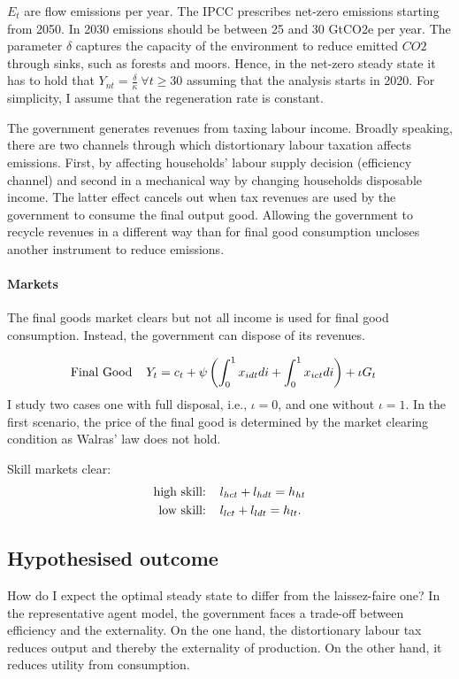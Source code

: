$E_t$ are flow emissions per year. The IPCC prescribes net-zero emissions starting from 2050. In 2030 emissions should be between 25 and 30 GtCO2e per year. The parameter $\delta$ captures the capacity of the environment to reduce emitted $CO2$ through sinks, such as forests and moors. Hence, in the net-zero steady state it has to hold that $Y_{nt}=\frac{\delta}{\kappa}\ \forall t\geq 30$ assuming that the analysis starts in 2020. For simplicity, I assume that the regeneration rate is constant. %

The government generates revenues from taxing labour income. 
Broadly speaking, there are two channels through which distortionary labour taxation affects emissions. First, by affecting households' labour supply decision (efficiency channel) and second in a mechanical way by changing households disposable income. The latter effect cancels out when tax revenues are used by the government to consume the final output good. Allowing the government to recycle revenues in a different way than for final good consumption uncloses another instrument to reduce emissions. 

\paragraph{Markets}
The final goods market clears but not all income is used for final good consumption.  Instead, the government can dispose of its revenues.
 
\begin{align*}
\text{Final Good}\hspace{4mm}& Y_{t}=c_t+\psi\left(\int_{0}^1x_{idt}di+\int_{0}^1x_{ict}di\right)+\iota G_t
\end{align*}
 I study two cases one with full disposal, i.e., $\iota=0$, and one without $\iota=1$. In the first scenario, the price of the final good is determined by the market clearing condition as Walras' law does not hold. 

Skill markets clear: 
\begin{align}
\text{high skill:}\hspace{4mm}& l_{hct}+l_{hdt}=h_{ht}\\
\text{low skill:}\hspace{4mm}&l_{lct}+l_{ldt}=h_{lt}.
\end{align}

\subsection{Hypothesised outcome}
How do I expect the optimal steady state to differ from the laissez-faire one? 
In the representative agent model, the government faces a trade-off  between efficiency and the externality. 
On the one hand, the distortionary labour tax reduces output and thereby the externality of production. On the other hand, it reduces utility from consumption.

